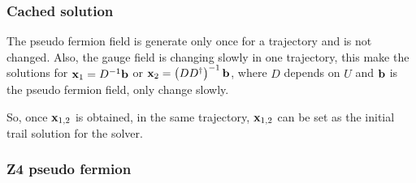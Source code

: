 \subsubsection{\label{sec:CachedSolution}Cached solution}

The pseudo fermion field is generate only once for a trajectory and is not changed. Also, the gauge field is changing slowly in one trajectory, this make the solutions for ${\bf x}_1=D^{-1}{\bf b}$ or ${\bf x}_2=\left(DD^{\dagger}\right)^{-1}{\bf b}$, where $D$ depends on $U$ and ${\bf b}$ is the pseudo fermion field, only change slowly.

So, once ${\bf x}_{1,2}$ is obtained, in the same trajectory, ${\bf x}_{1,2}$ can be set as the initial trail solution for the solver.

\subsubsection{\label{sec:Z4_fermion}Z4 pseudo fermion}



